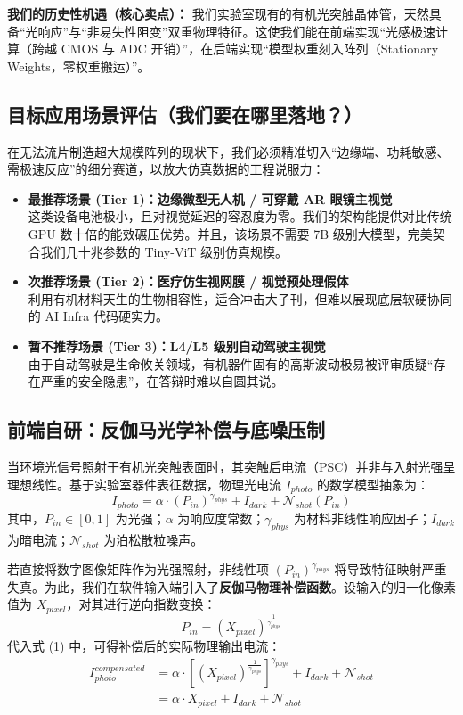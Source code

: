 \documentclass[12pt, a4paper]{ctexart}
\begin{document}
\textbf{我们的历史性机遇（核心卖点）：} 我们实验室现有的有机光突触晶体管，天然具备“光响应”与“非易失性阻变”双重物理特征。这使我们能在前端实现“光感极速计算（跨越 CMOS 与 ADC 开销）”，在后端实现“模型权重刻入阵列（Stationary Weights，零权重搬运）”。

\subsection{目标应用场景评估（我们要在哪里落地？）}
在无法流片制造超大规模阵列的现状下，我们必须精准切入“边缘端、功耗敏感、需极速反应”的细分赛道，以放大仿真数据的工程说服力：

\begin{itemize}
    \item \textbf{最推荐场景 (Tier 1)：边缘微型无人机 / 可穿戴 AR 眼镜主视觉} \\
    这类设备电池极小，且对视觉延迟的容忍度为零。我们的架构能提供对比传统 GPU 数十倍的能效碾压优势。并且，该场景不需要 7B 级别大模型，完美契合我们几十兆参数的 Tiny-ViT 级别仿真规模。
    \item \textbf{次推荐场景 (Tier 2)：医疗仿生视网膜 / 视觉预处理假体} \\
    利用有机材料天生的生物相容性，适合冲击大子刊，但难以展现底层软硬协同的 AI Infra 代码硬实力。
    \item \textbf{暂不推荐场景 (Tier 3)：L4/L5 级别自动驾驶主视觉} \\
    由于自动驾驶是生命攸关领域，有机器件固有的高斯波动极易被评审质疑“存在严重的安全隐患”，在答辩时难以自圆其说。
\end{itemize}

\subsection{前端自研：反伽马光学补偿与底噪压制}

当环境光信号照射于有机光突触表面时，其突触后电流（PSC）并非与入射光强呈理想线性。基于实验室器件表征数据，物理光电流 $I_{photo}$ 的数学模型抽象为：
\begin{equation}
    I_{photo} = \alpha \cdot (P_{in})^{\gamma_{phys}} + I_{dark} + \mathcal{N}_{shot}(P_{in})
\end{equation}
其中，$P_{in} \in [0, 1]$ 为光强；$\alpha$ 为响应度常数；$\gamma_{phys}$ 为材料非线性响应因子；$I_{dark}$ 为暗电流；$\mathcal{N}_{shot}$ 为泊松散粒噪声。

若直接将数字图像矩阵作为光强照射，非线性项 $(P_{in})^{\gamma_{phys}}$ 将导致特征映射严重失真。为此，我们在软件输入端引入了\textbf{反伽马物理补偿函数}。设输入的归一化像素值为 $X_{pixel}$，对其进行逆向指数变换：
\begin{equation}
    P_{in} = \left( X_{pixel} \right)^{\frac{1}{\gamma_{phys}}}
\end{equation}
代入式 (1) 中，可得补偿后的实际物理输出电流：
\begin{align}
    I_{photo}^{compensated} &= \alpha \cdot \left[ \left( X_{pixel} \right)^{\frac{1}{\gamma_{phys}}} \right]^{\gamma_{phys}} + I_{dark} + \mathcal{N}_{shot} \nonumber \\
    &= \alpha \cdot X_{pixel} + I_{dark} + \mathcal{N}_{shot}
\end{align}
\end{document}
